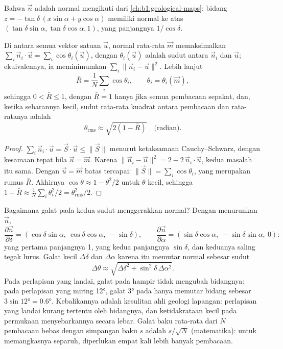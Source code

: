 Bahwa $\vec n$ adalah normal mengikuti dari \cref{ch:b1:geological-maps}: bidang $z = -\tan\delta\,(x\sin\alpha + y\cos\alpha)$ memiliki normal ke atas $(\tan\delta\sin\alpha, \tan\delta\cos\alpha, 1)$, yang panjangnya $1/\cos\delta$.

\begin{proposition}\label{prop:b1:field-lab-methods-1:vector-mean}
Di antara semua vektor satuan $\vec u$, normal rata-rata $\vec m$ memaksimalkan
$\sum_i \vec n_i\cdot\vec u = \sum_i \cos\theta_i(\vec u)$, dengan
$\theta_i(\vec u)$ adalah sudut antara $\vec n_i$ dan $\vec u$; ekuivalennya,
ia meminimumkan $\sum_i \|\vec n_i - \vec u\|^2$. Lebih lanjut
\[
  \bar R = \frac1N\sum_i \cos\theta_i, \qquad \theta_i = \theta_i(\vec m),
\]
sehingga $0 < \bar R \le 1$, dengan $\bar R = 1$ hanya jika semua pembacaan sepakat, dan, ketika sebarannya kecil, sudut rata-rata kuadrat antara pembacaan dan rata-ratanya adalah
\[
  \theta_{\text{rms}} \approx \sqrt{2(1 - \bar R)} \quad\text{(radian)}.
\]
\end{proposition}

\begin{proof}
$\sum_i \vec n_i\cdot\vec u = \vec S\cdot\vec u \le \|\vec S\|$ menurut ketaksamaan Cauchy--Schwarz, dengan kesamaan tepat bila $\vec u = \vec m$. Karena $\|\vec n_i - \vec u\|^2 = 2 - 2\,\vec n_i\cdot\vec u$, kedua masalah itu sama. Dengan $\vec u = \vec m$ batas tercapai: $\|\vec S\| = \sum_i\cos\theta_i$, yang merupakan rumus $\bar R$. Akhirnya $\cos\theta \approx 1 - \theta^2/2$ untuk $\theta$ kecil, sehingga $1 - \bar R \approx
\frac1N\sum_i\theta_i^2/2 = \theta_{\text{rms}}^2/2$.
\end{proof}

Bagaimana galat pada kedua sudut menggerakkan normal? Dengan menurunkan $\vec n$,
\[
  \frac{\partial\vec n}{\partial\delta} = (\cos\delta\sin\alpha,\ \cos\delta\cos\alpha,\ -\sin\delta),
  \qquad
  \frac{\partial\vec n}{\partial\alpha} = (\sin\delta\cos\alpha,\ -\sin\delta\sin\alpha,\ 0):
\]
yang pertama panjangnya 1, yang kedua panjangnya $\sin\delta$, dan keduanya saling tegak lurus. Galat kecil $\Delta\delta$ dan $\Delta\alpha$ karena itu memutar normal sebesar sudut
\[
  \Delta\theta \approx \sqrt{\Delta\delta^2 + \sin^2\delta\,\Delta\alpha^2}.
\]
Pada perlapisan yang landai, galat pada  hampir tidak mengubah bidangnya: pada perlapisan yang miring \ang{12}, galat \ang{3} pada  hanya memutar bidang sebesar $3\sin\ang{12} = \ang{0.6}$. Kebalikannya adalah kesulitan ahli geologi lapangan:  perlapisan yang landai kurang tertentu oleh bidangnya, dan ketidakrataan kecil pada permukaan menyebarkannya secara lebar. Galat baku rata-rata dari $N$ pembacaan bebas dengan simpangan baku $s$ adalah $s/\sqrt N$ (matematika): untuk memangkasnya separuh, diperlukan empat kali lebih banyak pembacaan.

